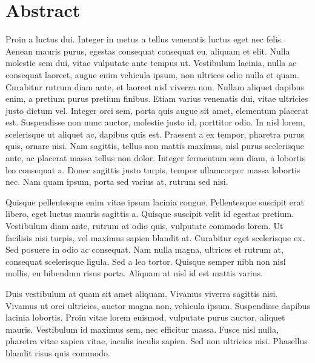 \chapter{Abstract}

Proin a luctus dui. Integer in metus a tellus venenatis luctus eget nec felis. Aenean mauris
purus, egestas consequat consequat eu, aliquam et elit. Nulla molestie sem dui, vitae vulputate
ante tempus ut. Vestibulum lacinia, nulla ac consequat laoreet, augue enim vehicula ipsum,
non ultrices odio nulla et quam. Curabitur rutrum diam ante, et laoreet nisl viverra non.
Nullam aliquet dapibus enim, a pretium purus pretium finibus. Etiam varius venenatis dui,
vitae ultricies justo dictum vel. Integer orci sem, porta quis augue sit amet, elementum
placerat est. Suspendisse non nunc auctor, molestie justo id, porttitor odio. In nisl lorem,
scelerisque ut aliquet ac, dapibus quis est. Praesent a ex tempor, pharetra purus quis,
ornare nisi. Nam sagittis, tellus non mattis maximus, nisl purus scelerisque ante, ac placerat
massa tellus non dolor. Integer fermentum sem diam, a lobortis leo consequat a. Donec sagittis
justo turpis, tempor ullamcorper massa lobortis nec. Nam quam ipsum, porta sed varius at,
rutrum sed nisi.

Quisque pellentesque enim vitae ipsum lacinia congue. Pellentesque suscipit erat libero,
eget luctus mauris sagittis a. Quisque suscipit velit id egestas pretium. Vestibulum diam
ante, rutrum at odio quis, vulputate commodo lorem. Ut facilisis nisi turpis, vel maximus
sapien blandit at. Curabitur eget scelerisque ex. Sed posuere in odio ac consequat. Nam
nulla magna, ultrices et rutrum at, consequat scelerisque ligula. Sed a leo tortor. Quisque
semper nibh non nisl mollis, eu bibendum risus porta. Aliquam at nisl id est mattis varius.

Duis vestibulum at quam sit amet aliquam. Vivamus viverra sagittis nisi. Vivamus ut orci
ultricies, auctor magna non, vehicula ipsum. Suspendisse dapibus lacinia lobortis. Proin
vitae lorem euismod, vulputate purus auctor, aliquet mauris. Vestibulum id maximus sem,
nec efficitur massa. Fusce nisl nulla, pharetra vitae sapien vitae, iaculis iaculis sapien.
Sed non ultricies nisi. Phasellus blandit risus quis commodo.